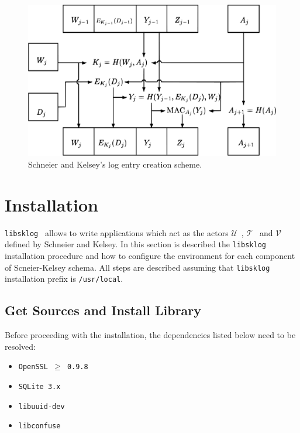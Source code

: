 \documentclass[a4paper,11pt,oneside]{report}
\def\libsklog{\texttt{libsklog}~\xspace}
\def\u{$\mathcal{U}$~\xspace}
\def\t{$\mathcal{T}$~\xspace}
\def\v{$\mathcal{V}$~\xspace}
\begin{document}
\begin{figure}
\begin{center}
\includegraphics[scale=0.4]{images/sk-logentry-gen}
\caption{Schneier and Kelsey's log entry creation scheme.}
\label{fig:sk}
\end{center}
\end{figure}


\chapter{Installation}

\libsklog allows to write applications which act as the actors \u, \t
and \v defined by Schneier and Kelsey. In this section is described
the \libsklog installation procedure and how to configure the
environment for
each component of Scneier-Kelsey
schema. All steps are described assuming that \libsklog installation
prefix is \texttt{/usr/local}.


\section{Get Sources and Install Library}

Before proceeding with the installation, the dependencies listed below
need to be resolved:

\begin{itemize}
\item \texttt{OpenSSL $\ge$ 0.9.8}
\item \texttt{SQLite 3.x}
\item \texttt{libuuid-dev}
\item \texttt{libconfuse}
\end{itemize}
\end{document}
